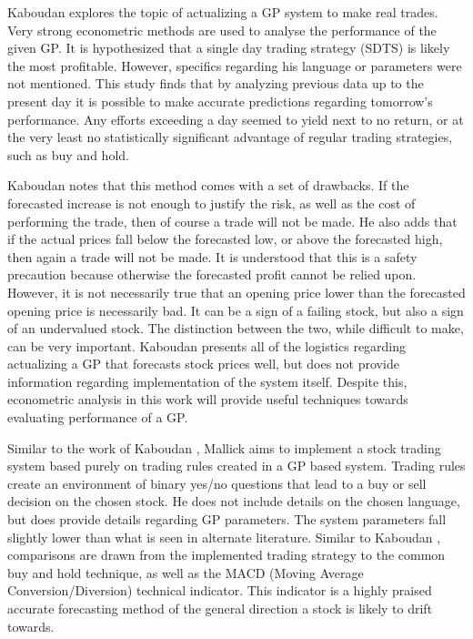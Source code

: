 \documentclass[12pt, letterpaper]{article}
\begin{document}
\textrm{\indent Kaboudan \cite{kaboudan} explores the topic of actualizing a GP system to make real trades. Very strong econometric methods are used to analyse the performance of the given GP. It is hypothesized that a single day trading strategy (SDTS) is likely the most profitable. However, specifics regarding his language or parameters were not mentioned. This study finds that by analyzing previous data up to the present day it is possible to make accurate predictions regarding tomorrow's performance. Any efforts exceeding a day seemed to yield next to no return, or at the very least no statistically significant advantage of regular trading strategies, such as buy and hold.}

\textrm{ \indent Kaboudan \cite{kaboudan} notes that this method comes with a set of drawbacks. If the forecasted increase is not enough to justify the risk, as well as the cost of performing the trade, then of course a trade will not be made. He also adds that if the actual prices fall below the forecasted low, or above the forecasted high, then again a trade will not be made. It is understood that this is a safety precaution because otherwise the forecasted profit cannot be relied upon. However, it is not necessarily true that an opening price lower than the forecasted opening price is necessarily bad. It can be a sign of a failing stock, but also a sign of an undervalued stock. The distinction between the two, while difficult to make, can be very important. Kaboudan \cite{kaboudan} presents all of the logistics regarding actualizing a GP that forecasts stock prices well, but does not provide information regarding implementation of the system itself. Despite this, econometric analysis in this work will provide useful techniques towards evaluating performance of a GP. }

\textrm{ \indent Similar to the work of Kaboudan \cite{kaboudan}, Mallick \cite{mallick} aims to implement a stock trading system based purely on trading rules created in a GP based system. Trading rules create an environment of binary yes/no questions that lead to a buy or sell decision on the chosen stock. He does not include details on the chosen language, but does provide details regarding GP parameters. The system parameters fall slightly lower than what is seen in alternate literature. Similar to Kaboudan \cite{kaboudan}, comparisons are drawn from the implemented trading strategy to the common buy and hold technique, as well as the MACD (Moving Average Conversion/Diversion) technical indicator. This indicator is a highly praised accurate forecasting method of the general direction a stock is likely to drift towards. }
\end{document}
